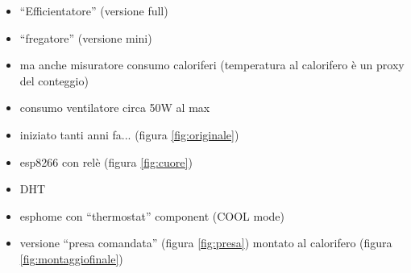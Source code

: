 \documentclass[a4paper,12pt]{article}
\begin{document}
\begin{itemize}
	\item ``Efficientatore'' (versione full)
	\item ``fregatore'' (versione mini) 
	\item ma anche misuratore consumo caloriferi (temperatura al calorifero è un proxy del conteggio)
	\item consumo ventilatore circa 50W al max
	\item iniziato tanti anni fa... (figura \ref{fig:originale})
	\item esp8266 con relè (figura \ref{fig:cuore})
	\item DHT
	\item esphome con ``thermostat'' component (COOL mode)
	\item versione ``presa comandata'' (figura \ref{fig:presa}) montato al calorifero (figura \ref{fig:montaggiofinale})
\end{itemize}
\end{document}
